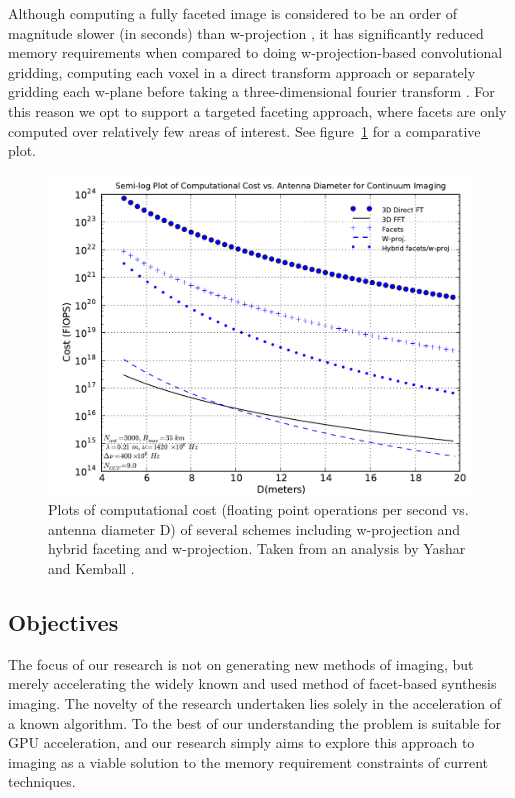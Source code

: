 \documentclass[a4paper, two column]{article}
\begin{document}
Although computing a fully faceted image is considered to be an order of magnitude slower (in seconds) than w-projection \cite{1416440}, it has significantly reduced memory requirements when compared 
to doing w-projection-based convolutional gridding, computing each voxel in a direct transform approach or separately gridding each w-plane before taking a three-dimensional fourier 
transform \cite{yashar2009tdp}. For this reason we opt to support a targeted faceting approach, where facets are only computed over relatively few areas of interest. 
See figure~\ref{IMG_PERFORMANCE_COMPARISON} for a comparative plot.
\begin{figure}
 \begin{mdframed}
  \includegraphics[width=1.0\textwidth]{performance_faceting.png}
  \caption{Plots of computational cost (floating point operations per second vs. antenna diameter D) of several schemes including w-projection and hybrid faceting and w-projection. Taken from an analysis by Yashar and Kemball \cite{yashar2009tdp}.}
  \label{IMG_PERFORMANCE_COMPARISON}
 \end{mdframed}
\end{figure}

\subsection{Objectives}
The focus of our research is not on generating new methods of imaging, but merely accelerating the widely known and used method of facet-based synthesis imaging. The novelty of the research undertaken 
lies solely in the acceleration of a known algorithm. To the best of our understanding the problem is suitable for GPU acceleration, and our research simply aims to explore this approach to imaging 
as a viable solution to the memory requirement constraints of current techniques.
\end{document}
